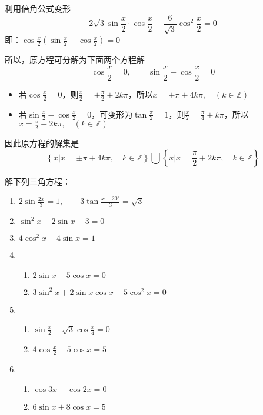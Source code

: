 \begin{solution}
利用倍角公式变形
\[2\sqrt{3}\sin\frac{x}{2}\cdot \cos\frac{x}{2}-\frac{6}{\sqrt{3}}\cos^2\frac{x}{2}=0  \]
即：$\cos\frac{x}{2}\left(\sin\frac{x}{2}- \cos\frac{x}{2}\right)=0$

所以，原方程可分解为下面两个方程解
\[\cos\frac{x}{2}=0,\qquad \sin\frac{x}{2}-\cos\frac{x}{2}=0\]
\begin{itemize}
    \item 若$\cos\frac{x}{2}=0$，则$\frac{x}{2}=\pm\frac{\pi}{2}+2k\pi$，所以$x=\pm \pi+4k\pi,\quad (k\in\mathbb{Z})$
    \item 若$\sin\frac{x}{2}-\cos\frac{x}{2}=0$，可变形为$\tan\frac{\pi}{2}=1$，则$\frac{x}{2}=\frac{\pi}{4}+k\pi$，所以$x=\frac{\pi}{2}+2k\pi,\quad (k\in\mathbb{Z})$
\end{itemize}
因此原方程的解集是
\[\left\{x \Big|x=\pm \pi+4k\pi,\quad k\in\mathbb{Z}\right\}\bigcup \left\{x \Big|x=\frac{\pi}{2}+2k\pi,\quad k\in\mathbb{Z}\right\}\]
\end{solution}



\begin{ex}
解下列三角方程：
\begin{enumerate}
    \item $2\sin\frac{2x}{3}=1,\qquad 3\tan\frac{x+20^{\circ}}{3}=\sqrt{3}$
    \item $\sin^2x-2\sin x-3=0$
    \item $4\cos^2 x-4\sin x=1$
    \item \begin{enumerate}
        \item $2\sin x-5\cos x=0$
        \item $3\sin^2 x+2\sin x\cos x-5\cos^2 x=0$
    \end{enumerate}
    \item \begin{enumerate}
        \item $\sin\frac{x}{2}-\sqrt{3}\cos\frac{x}{4}=0$
        \item $4\cos\frac{x}{2}-5\cos x=5$
    \end{enumerate}
    \item \begin{enumerate}
        \item $\cos 3x+\cos 2x=0$
        \item $6\sin x+8\cos x=5$
    \end{enumerate}
\end{enumerate}
\end{ex}

